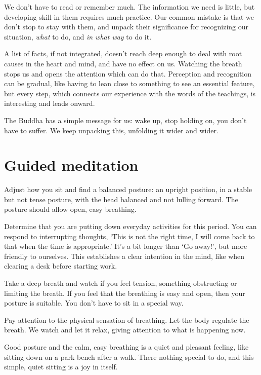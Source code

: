 We don't have to read or remember much. The information we need is
little, but developing skill in them requires much practice. Our common
mistake is that we don't stop to stay with them, and unpack their
significance for recognizing our situation, \emph{what} to do, and
\emph{in what way} to do it.

A list of facts, if not integrated, doesn't reach deep enough to deal
with root causes in the heart and mind, and have no effect on us.
Watching the breath stops us and opens the attention which can do that.
Perception and recognition can be gradual, like having to lean close to
something to see an essential feature, but every step, which connects
our experience with the words of the teachings, is interesting and leads
onward.

The Buddha has a simple message for us: wake up, stop holding on, you
don't have to suffer. We keep unpacking this, unfolding it wider and
wider.

\section{Guided meditation}


Adjust how you sit and find a balanced posture: an upright position, in
a stable but not tense posture, with the head balanced and not lulling
forward. The posture should allow open, easy breathing.

\enlargethispage*{\baselineskip}

Determine that you are putting down everyday activities for this period.
You can respond to interrupting thoughts, `This is not the right time, I
will come back to that when the time is appropriate.' It's a bit longer
than `Go away!', but more friendly to ourselves. This establishes a
clear intention in the mind, like when clearing a desk before starting
work.

Take a deep breath and watch if you feel tension, something obstructing
or limiting the breath. If you feel that the breathing is easy and open,
then your posture is suitable. You don't have to sit in a special way.

Pay attention to the physical sensation of breathing. Let the body
regulate the breath. We watch and let it relax, giving attention to what
is happening now.

Good posture and the calm, easy breathing is a quiet and pleasant
feeling, like sitting down on a park bench after a walk. There nothing
special to do, and this simple, quiet sitting is a joy in itself.


